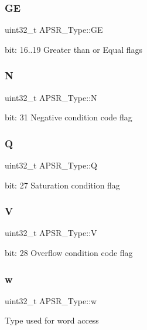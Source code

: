\subsubsection{\texorpdfstring{GE}{GE}}
{\footnotesize\ttfamily uint32\+\_\+t A\+P\+S\+R\+\_\+\+Type\+::\+GE}

bit\+: 16..19 Greater than or Equal flags \mbox{\label{unionAPSR__Type_a7e7bbba9b00b0bb3283dc07f1abe37e0}} 
\subsubsection{\texorpdfstring{N}{N}}
{\footnotesize\ttfamily uint32\+\_\+t A\+P\+S\+R\+\_\+\+Type\+::N}

bit\+: 31 Negative condition code flag \mbox{\label{unionAPSR__Type_a22d10913489d24ab08bd83457daa88de}} 
\subsubsection{\texorpdfstring{Q}{Q}}
{\footnotesize\ttfamily uint32\+\_\+t A\+P\+S\+R\+\_\+\+Type\+::Q}

bit\+: 27 Saturation condition flag \mbox{\label{unionAPSR__Type_a8004d224aacb78ca37774c35f9156e7e}} 
\subsubsection{\texorpdfstring{V}{V}}
{\footnotesize\ttfamily uint32\+\_\+t A\+P\+S\+R\+\_\+\+Type\+::V}

bit\+: 28 Overflow condition code flag \mbox{\label{unionAPSR__Type_ae4c2ef8c9430d7b7bef5cbfbbaed3a94}} 
\subsubsection{\texorpdfstring{w}{w}}
{\footnotesize\ttfamily uint32\+\_\+t A\+P\+S\+R\+\_\+\+Type\+::w}

Type used for word access \mbox{\label{unionAPSR__Type_a3b04d58738b66a28ff13f23d8b0ba7e5}} 
